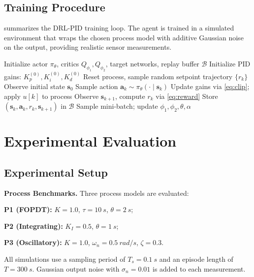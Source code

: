 \documentclass[conference,a4paper]{IEEEtran}[2015/08/26]
\newcommand{\vek}[1]{\bm{#1}}
\begin{document}
\subsection{Training Procedure}

 summarizes the DRL-PID training loop. The agent is
trained in a simulated environment that wraps the chosen process model
with additive Gaussian noise on the output, providing realistic sensor
measurements.

\begin{algorithm}[t]
  \caption{DRL-PID Training}
  \label{alg:drlpid}
  \begin{algorithmic}[1]
    \STATE Initialize actor $\pi_\theta$, critics $Q_{\phi_1}, Q_{\phi_2}$,
           target networks, replay buffer $\mathcal{B}$
    \STATE Initialize PID gains: $K_p^{(0)}, K_i^{(0)}, K_d^{(0)}$
      \STATE Reset process, sample random setpoint trajectory $\{r_k\}$
      \STATE Observe initial state $\vek{s}_0$
        \STATE Sample action $\vek{a}_k \sim \pi_\theta(\cdot \mid \vek{s}_k)$
        \STATE Update gains via \cref{eq:clip}; apply $u[k]$ to process
        \STATE Observe $\vek{s}_{k+1}$, compute $r_k$ via \cref{eq:reward}
        \STATE Store $(\vek{s}_k, \vek{a}_k, r_k, \vek{s}_{k+1})$ in $\mathcal{B}$
          \STATE Sample mini-batch; update $\phi_1, \phi_2, \theta, \alpha$
        \ENDIF
      \ENDFOR
    \ENDFOR
  \end{algorithmic}
\end{algorithm}

\section{Experimental Evaluation}
\label{sec:exp}

\subsection{Experimental Setup}

\textbf{Process Benchmarks.}
Three process models are evaluated:
\begin{compactitem}
  \item \textbf{P1 (FOPDT):} $K = 1.0$, $\tau = \SI{10}{s}$, $\theta = \SI{2}{s}$;
  \item \textbf{P2 (Integrating):} $K_I = 0.5$, $\theta = \SI{1}{s}$;
  \item \textbf{P3 (Oscillatory):} $K = 1.0$, $\omega_n = \SI{0.5}{rad/s}$,
    $\zeta = 0.3$.
\end{compactitem}
All simulations use a sampling period of $T_s = \SI{0.1}{s}$ and an
episode length of $T = \SI{300}{s}$. Gaussian output noise with
$\sigma_n = 0.01$ is added to each measurement.
\end{document}
